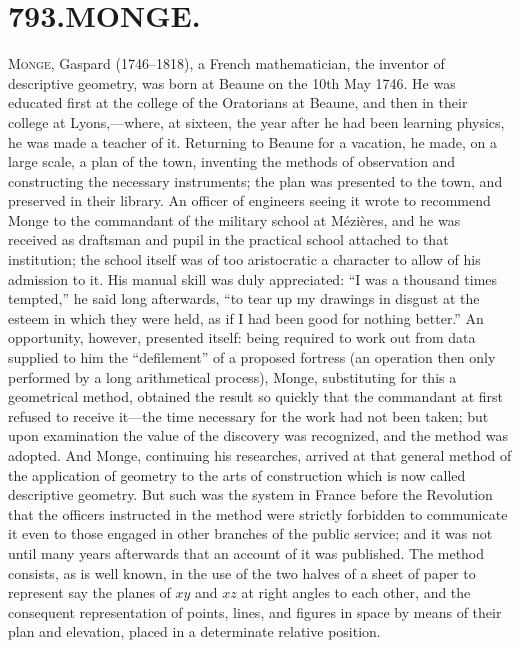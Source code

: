 \documentclass[11pt,a4paper]{book}
\begin{document}
\section*{793.\quad MONGE.}


\smallskip

\textsc{Monge,} Gaspard (1746--1818), a French mathematician, the inventor of descriptive geometry, was born at Beaune on the 10th May 1746. He was educated first at the college of the Oratorians at Beaune, and then in their college at Lyons,---where, at sixteen, the year after he had been learning physics, he was made a teacher of it. Returning to Beaune for a vacation, he made, on a large scale, a plan of the town, inventing the methods of observation and constructing the necessary instruments; the plan was presented to the town, and preserved in their library. An officer of engineers seeing it wrote to recommend Monge to the commandant of the military school at M\'ezi\`eres, and he was received as draftsman and pupil in the practical school attached to that institution; the school itself was of too aristocratic a character to allow of his admission to it. His manual skill was duly appreciated: ``I was a thousand times tempted,'' he said long afterwards, ``to tear up my drawings in disgust at the esteem in which they were held, as if I had been good for nothing better.'' An opportunity, however, presented itself: being required to work out from data supplied to him the ``defilement'' of a proposed fortress (an operation then only performed by a long arithmetical process), Monge, substituting for this a geometrical method, obtained the result so quickly that the commandant at first refused to receive it---the time necessary for the work had not been taken; but upon examination the value of the discovery was recognized, and the method was adopted. And Monge, continuing his researches, arrived at that general method of the application of geometry to the arts of construction which is now called descriptive geometry. But such was the system in France before the Revolution that the officers instructed in the method were strictly forbidden to communicate it even to those engaged in other branches of the public service; and it was not until many years afterwards that an account of it was published. The method consists, as is well known, in the use of the two halves of a sheet of paper to represent say the planes of $xy$ and $xz$ at right angles to each other, and the consequent representation of points, lines, and figures in space by means of their plan and elevation, placed in a determinate relative position.
\end{document}
